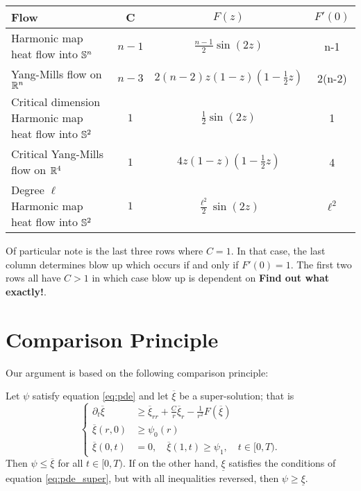 \documentclass{amsart}
\begin{document}
\begin{center}
\begin{tabular}{ l | c | c | c}
Flow & C & \(F(z)\) & \(F'(0)\) \\
\hline
Harmonic map heat flow into \(\S^n\) & \(n-1\) & \(\tfrac{n-1}{2} \sin(2z)\) & n-1 \\
Yang-Mills flow on \(\R^n\) & \(n-3\) & \(2(n-2) z(1 - z)(1 - \tfrac{1}{2} z)\) & 2(n-2) \\
Critical dimension Harmonic map heat flow into \(\S^2\) & \(1\) & \(\tfrac{1}{2} \sin(2z)\) & 1 \\
Critical Yang-Mills flow on \(\R^4\) & \(1\) & \(4 z(1 - z)(1 - \tfrac{1}{2} z)\) & 4 \\
Degree \(\ell\) Harmonic map heat flow into \(\S^2\) & \(1\) & \(\tfrac{\ell^2}{2} \sin(2z)\) & \(\ell^2\)
\end{tabular}
\end{center}

Of particular note is the last three rows where \(C = 1\). In that case, the last column determines blow up which occurs if and only if \(F'(0) = 1\). The first two rows all have \(C > 1\) in which case blow up is dependent on \textbf{Find out what exactly!}.


\section{Comparison Principle}

Our argument is based on the following comparison principle:

\begin{thm}
Let \(\psi\) satisfy equation \eqref{eq:pde} and let \(\overline{\xi}\) be a super-solution; that is
\begin{equation}
\label{eq:pde_super}
\begin{cases}
\partial_t \overline{\xi} &\geq \overline{\xi}_{rr} + \frac{C}{r} \overline{\xi}_r - \frac{1}{r^2} F(\overline{\xi}) \\
\overline{\xi}(r, 0) &\geq \psi_0(r) \\
\overline{\xi}(0, t) &= 0, \quad \overline{\xi}(1, t) \geq \psi_1, \quad t \in [0, T).
\end{cases}
\end{equation}
Then \(\psi \leq \overline{\xi}\) for all \(t \in [0, T)\). If on the other hand, \(\underline{\xi}\) satisfies the conditions of equation \eqref{eq:pde_super}, but with all inequalities reversed, then \(\psi \geq \underline{\xi}\).
\end{thm}
\end{document}
